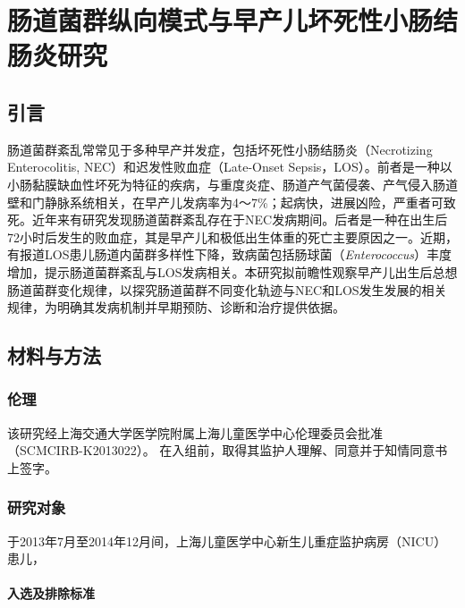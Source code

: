 
\chapter{肠道菌群纵向模式与早产儿坏死性小肠结肠炎研究}
\label{chap:nec}

\section{引言}
肠道菌群紊乱常常见于多种早产并发症，包括坏死性小肠结肠炎（Necrotizing Enterocolitis, NEC）和迟发性败血症（Late-Onset Sepsis，LOS）。前者是一种以小肠黏膜缺血性坏死为特征的疾病，与重度炎症、肠道产气菌侵袭、产气侵入肠道壁和门静脉系统相关\cite{neu2011necrotizing}，在早产儿发病率为4～7\%\cite{rees2010national}；起病快，进展凶险，严重者可致死。近年来有研究发现肠道菌群紊乱存在于NEC发病期间。后者是一种在出生后72小时后发生的败血症，其是早产儿和极低出生体重的死亡主要原因之一\cite{stoll2002late}。近期，有报道LOS患儿肠道内菌群多样性下降\cite{mai2013distortions}，致病菌包括肠球菌（\textit{Enterococcus}）丰度增加\cite{stewart2017longitudinal}，提示肠道菌群紊乱与LOS发病相关。本研究拟前瞻性观察早产儿出生后总想肠道菌群变化规律，以探究肠道菌群不同变化轨迹与NEC和LOS发生发展的相关规律，为明确其发病机制并早期预防、诊断和治疗提供依据。

\section{材料与方法}
  \subsection{伦理}
  该研究经上海交通大学医学院附属上海儿童医学中心伦理委员会批准（SCMCIRB-K2013022）。 在入组前，取得其监护人理解、同意并于知情同意书上签字。
  \subsection{研究对象}
  于2013年7月至2014年12月间，上海儿童医学中心新生儿重症监护病房（NICU）患儿，
    \subsubsection{入选及排除标准}
